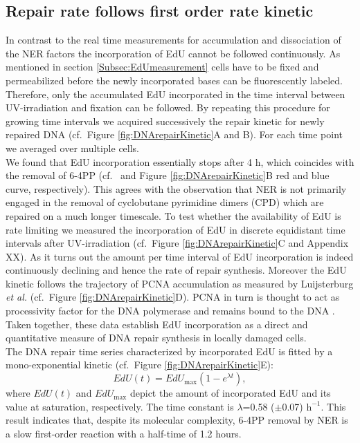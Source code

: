 \subsection{Repair rate follows first order rate kinetic}

In contrast to the real time measurements for accumulation and dissociation of the NER factors the incorporation of EdU cannot be followed continuously. As mentioned in section \ref{Subsec:EdUmeasurement} cells have to be fixed and permeabilized before the newly incorporated bases can be fluorescently labeled. Therefore, only the accumulated EdU incorporated in the time interval between UV-irradiation and fixation can be followed. By repeating this procedure for growing time intervals we acquired successively the repair kinetic for newly repaired DNA (cf.\ Figure \ref{fig:DNArepairKinetic}A and B). For each time point we averaged over multiple cells. \\
We found that EdU incorporation essentially stops after 4 h, which coincides with the removal of 6-4PP (cf.\ \cite{Luijsterburg2010} and Figure \ref{fig:DNArepairKinetic}B red and blue curve, respectively). This agrees with the observation that NER is not primarily engaged in the removal of cyclobutane pyrimidine dimers (CPD) which are repaired on a much longer timescale. To test whether the availability of EdU is rate limiting we measured the incorporation of EdU in discrete equidistant time intervals after UV-irradiation (cf.\ Figure \ref{fig:DNArepairKinetic}C and Appendix XX). As it turns out the amount per time interval of EdU incorporation is indeed continuously declining and hence the rate of repair synthesis. Moreover the EdU kinetic follows the trajectory of PCNA accumulation as measured by Luijsterburg \textit{et al.} \cite{Luijsterburg2010} (cf.\ Figure \ref{fig:DNArepairKinetic}D). PCNA in turn is thought to act as processivity factor for the DNA polymerase and remains bound to the DNA \cite{Luijsterburg2010,Essers2005,Sporbert2002}. Taken together, these data establish EdU incorporation as a direct and quantitative measure of DNA repair synthesis in locally damaged cells.\\
The DNA repair time series characterized by incorporated EdU is fitted by a mono-exponential kinetic (cf.\ Figure \ref{fig:DNArepairKinetic}E):
\begin{equation}
EdU(t) = EdU_\text{max}(1 - e^{\lambda t}),
\label{Eqn:EdU_kinetic}
\end{equation}  
where $EdU(t)$ and $EdU_{\text{max}}$ depict the amount of incorporated EdU and its value at saturation, respectively. The time constant is $\lambda$=0.58 ($\pm$0.07) $\text{h}^{-\text{1}}$. This result indicates that, despite its molecular complexity, 6-4PP removal by NER is a slow first-order reaction with a half-time of 1.2 hours.          
